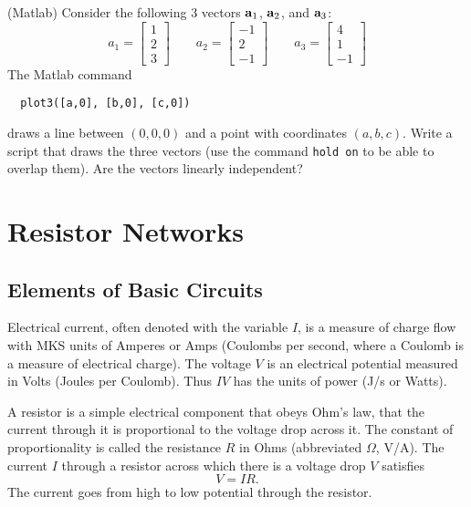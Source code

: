 \begin{problem}
\label{matlab_2009_a5_2}
(Matlab) Consider the following 3 vectors $\aa_1$, $\aa_2$, and $\aa_3$:
$$
a_1 = \left[\begin{array}{c} 1\\2\\3 \end{array}\right] \qquad
a_2 = \left[\begin{array}{c} -1\\2\\-1 \end{array}\right] \qquad
a_3 = \left[\begin{array}{c} 4\\1\\-1 \end{array}\right]
$$
The Matlab command
\begin{verbatim}
  plot3([a,0], [b,0], [c,0])
\end{verbatim}
draws a line between $(0,0,0)$ and a point with coordinates $(a,b,c)$. Write a script that draws the three vectors (use the command {\tt hold on} to be able to overlap them). Are the vectors linearly independent?

\end{problem}

\section{Resistor Networks}
\label{sec_res_networks}
\subsection{Elements of Basic Circuits}

Electrical current, often denoted with the variable $I$, is a measure 
of charge flow with MKS units of Amperes or Amps (Coulombs per second, 
where a Coulomb is a measure of electrical charge). The voltage $V$ 
is an electrical potential measured in Volts (Joules per Coulomb). Thus 
$IV$ has the units of power (J/s or Watts). 

A resistor is a simple electrical component that obeys Ohm's law, 
that the current through it is proportional to the voltage drop across it. 
The constant of proportionality is called the resistance $R$ in Ohms
(abbreviated $\Omega$, V/A). The current $I$ through a resistor across 
which there is a voltage drop $V$ satisfies 
\[
V = IR.
\]
The current goes from high to low potential through the resistor. 

